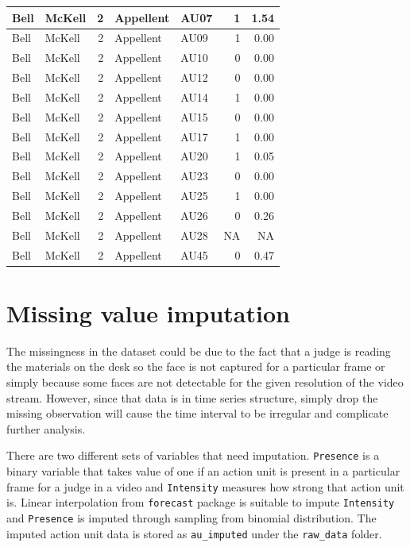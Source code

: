 \documentclass{monashthesis}
\begin{document}
\begin{table}[t]
{\begin{tabular}{l|l|r|l|l|r|r}
\hline
Bell & McKell & 2 & Appellent & AU07 & 1 & 1.54\\
\hline
Bell & McKell & 2 & Appellent & AU09 & 1 & 0.00\\
\hline
Bell & McKell & 2 & Appellent & AU10 & 0 & 0.00\\
\hline
Bell & McKell & 2 & Appellent & AU12 & 0 & 0.00\\
\hline
Bell & McKell & 2 & Appellent & AU14 & 1 & 0.00\\
\hline
Bell & McKell & 2 & Appellent & AU15 & 0 & 0.00\\
\hline
Bell & McKell & 2 & Appellent & AU17 & 1 & 0.00\\
\hline
Bell & McKell & 2 & Appellent & AU20 & 1 & 0.05\\
\hline
Bell & McKell & 2 & Appellent & AU23 & 0 & 0.00\\
\hline
Bell & McKell & 2 & Appellent & AU25 & 1 & 0.00\\
\hline
Bell & McKell & 2 & Appellent & AU26 & 0 & 0.26\\
\hline
Bell & McKell & 2 & Appellent & AU28 & NA & NA\\
\hline
Bell & McKell & 2 & Appellent & AU45 & 0 & 0.47\\
\hline
\end{tabular}}
\end{table}

\hypertarget{missing-value-imputation}{%
\section{Missing value imputation}\label{missing-value-imputation}}

The missingness in the dataset could be due to the fact that a judge is reading the materials on the desk so the face is not captured for a particular frame or simply because some faces are not detectable for the given resolution of the video stream. However, since that data is in time series structure, simply drop the missing observation will cause the time interval to be irregular and complicate further analysis.

There are two different sets of variables that need imputation. \texttt{Presence} is a binary variable that takes value of one if an action unit is present in a particular frame for a judge in a video and \texttt{Intensity} measures how strong that action unit is. Linear interpolation from \texttt{forecast} package is suitable to impute \texttt{Intensity} and \texttt{Presence} is imputed through sampling from binomial distribution. The imputed action unit data is stored as \texttt{au\_imputed} under the \texttt{raw\_data} folder.
\end{document}
